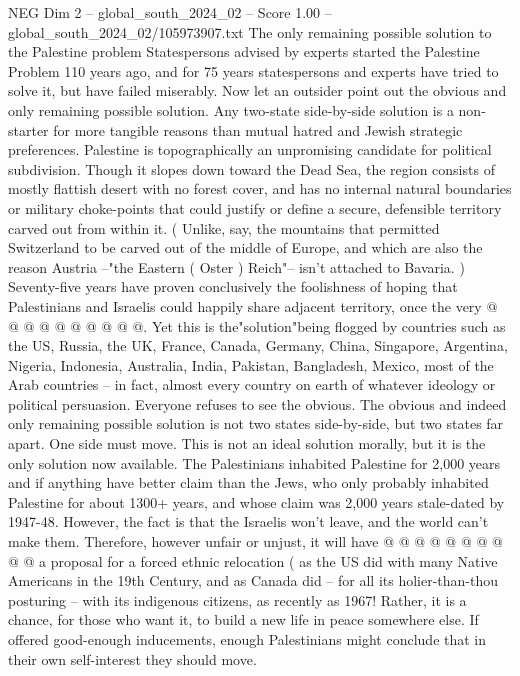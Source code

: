 \begin{textsample}{NEG Dim 2 – global\_south\_2024\_02 – Score 1.00 – global\_south\_2024\_02/105973907.txt}  \label{ex:f2_neg_249}
The only remaining possible solution to the Palestine problem Statespersons advised by experts started the Palestine Problem 110 years ago, and for 75 years statespersons and experts have tried to solve it, but have failed miserably.
Now let an outsider point out the obvious and only remaining possible solution.
Any two-state side-by-side solution is a non-starter for more tangible reasons than mutual hatred and Jewish strategic preferences.
Palestine is topographically an unpromising candidate for political subdivision.
Though it slopes down toward the Dead Sea, the region consists of mostly flattish desert with no forest cover, and has no internal natural boundaries or military choke-points that could justify or define a secure, defensible territory carved out from within it. ( Unlike, say, the mountains that permitted Switzerland to be carved out of the middle of Europe, and which are also the reason Austria --"the Eastern ( Oster ) Reich"-- isn't attached to Bavaria. ) Seventy-five years have proven conclusively the foolishness of hoping that Palestinians and Israelis could happily share adjacent territory, once the very @ @ @ @ @ @ @ @ @ @.
Yet this is the"solution"being flogged by countries such as the US, Russia, the UK, France, Canada, Germany, China, Singapore, Argentina, Nigeria, Indonesia, Australia, India, Pakistan, Bangladesh, Mexico, most of the Arab countries -- in fact, almost every country on earth of whatever ideology or political persuasion.
Everyone refuses to see the obvious.
The obvious and indeed only remaining possible solution is not two states side-by-side, but two states far apart.
One side must move.
This is not an ideal solution morally, but it is the only solution now available.
The Palestinians inhabited Palestine for 2,000 years and if anything have better claim than the Jews, who only probably inhabited Palestine for about 1300+ years, and whose claim was 2,000 years stale-dated by 1947-48.
However, the fact is that the Israelis won't leave, and the world can't make them.
Therefore, however unfair or unjust, it will have @ @ @ @ @ @ @ @ @ @ a proposal for a forced ethnic relocation ( as the US did with many Native Americans in the 19th Century, and as Canada did -- for all its holier-than-thou posturing -- with its indigenous citizens, as recently as 1967!
Rather, it is a chance, for those who want it, to build a new life in peace somewhere else.
If offered good-enough inducements, enough Palestinians might conclude that in their own self-interest they should move.

\end{textsample}
